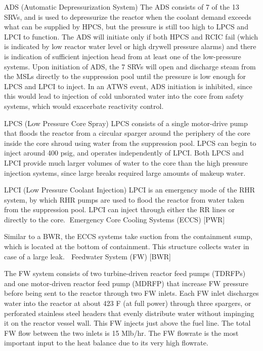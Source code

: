 \documentclass[10pt]{article}
\begin{document}
ADS (Automatic Depressurization System)
The ADS consists of 7 of the 13 SRVs, and is used to depressurize the reactor when the coolant demand exceeds what can be supplied by HPCS, but the pressure is still too high to LPCS and LPCI to function. The ADS will initiate only if both HPCS and RCIC fail (which is indicated by low reactor water level or high drywell pressure alarms) and there is indication of sufficient injection head from at least one of the low-pressure systems. Upon initiation of ADS, the 7 SRVs will open and discharge steam from the MSLs directly to the suppression pool until the pressure is low enough for LPCS and LPCI to inject.  In an ATWS event, ADS initiation is inhibited, since this would lead to injection of cold unborated water into the core from safety systems, which would exacerbate reactivity control. 

LPCS (Low Pressure Core Spray)
LPCS consists of a single motor-drive pump that floods the reactor from a circular sparger around the periphery of the core inside the core shroud using water from the suppression pool. LPCS can begin to inject around 400 psig, and operates independently of LPCI. Both LPCS and LPCI provide much larger volumes of water to the core than the high pressure injection systems, since large breaks required large amounts of makeup water. 

LPCI (Low Pressure Coolant Injection)
LPCI is an emergency mode of the RHR system, by which RHR pumps are used to flood the reactor from water taken from the suppression pool. LPCI can inject through either the RR lines or directly to the core.
Emergency Core Cooling Systems (ECCS) [PWR]

Similar to a BWR, the ECCS systems take suction from the containment sump, which is located at the bottom of containment. This structure collects water in case of a large leak. 
Feedwater System (FW) [BWR]

The FW system consists of two turbine-driven reactor feed pumps (TDRFPs) and one motor-driven reactor feed pump (MDRFP) that increase FW pressure before being sent to the reactor through two FW inlets. Each FW inlet discharges water into the reactor at about 423 F (at full power) through three spargers, or perforated stainless steel headers that evenly distribute water without impinging it on the reactor vessel wall. This FW injects just above the fuel line. The total FW flow between the two inlets is 15 Mlb/hr. The FW flowrate is the most important input to the heat balance due to its very high flowrate.
\end{document}
